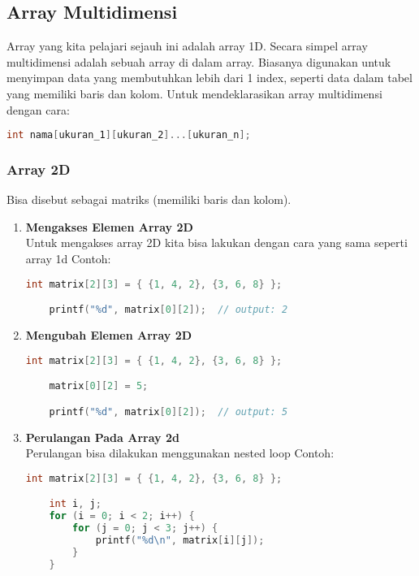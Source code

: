 \subsection{Array Multidimensi}

Array yang kita pelajari sejauh ini adalah array 1D.
Secara simpel array multidimensi adalah sebuah array di dalam array.
Biasanya digunakan untuk menyimpan data yang membutuhkan lebih dari 1 index, seperti data dalam tabel yang memiliki baris dan kolom.
Untuk mendeklarasikan array multidimensi dengan cara:
{
\captionsetup[lstlisting]{labelformat=empty, justification=raggedright, singlelinecheck=false} %
\begin{lstlisting}[language=c, caption={syntax}]
	int nama[ukuran_1][ukuran_2]...[ukuran_n];
\end{lstlisting}
}

\subsubsection{Array 2D}

Bisa disebut sebagai matriks (memiliki baris dan kolom).
\begin{enumerate}[label={}, leftmargin=*]
	\item \textbf{Mengakses Elemen Array 2D}\\
	Untuk mengakses array 2D kita bisa lakukan dengan cara yang sama seperti array 1d
	Contoh:
	\begin{lstlisting}[language=c]
	int matrix[2][3] = { {1, 4, 2}, {3, 6, 8} };

	printf("%d", matrix[0][2]);  // output: 2
\end{lstlisting}
	\item \textbf{Mengubah Elemen Array 2D}
	\begin{lstlisting}[language=c]
	int matrix[2][3] = { {1, 4, 2}, {3, 6, 8} };

	matrix[0][2] = 5;

	printf("%d", matrix[0][2]);  // output: 5
\end{lstlisting}
	\item \textbf{Perulangan Pada Array 2d}\\
	Perulangan bisa dilakukan menggunakan nested loop
	Contoh:
	\begin{lstlisting}[language=c]
	int matrix[2][3] = { {1, 4, 2}, {3, 6, 8} };

	int i, j;
	for (i = 0; i < 2; i++) {
		for (j = 0; j < 3; j++) {
			printf("%d\n", matrix[i][j]);
		}
	}
\end{lstlisting}
\end{enumerate}

